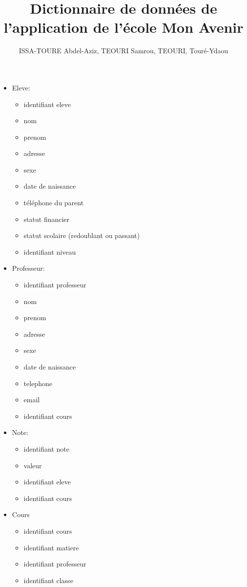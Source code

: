 \documentclass[12pt,a4paper]{article}
\author{ISSA-TOURE Abdel-Aziz, TEOURI Samrou, TEOURI, Touré-Ydaou}
\title{Dictionnaire de données de l'application de l'école Mon Avenir}
\begin{document}
\maketitle

\begin{itemize}
\item Eleve:
	\begin{itemize}
		\item identifiant eleve
		\item nom
		\item prenom
		\item adresse
		\item sexe
		\item date de naissance
		\item téléphone du parent
		\item statut financier
		\item statut scolaire (redoublant ou passant)
		\item identifiant niveau
	\end{itemize}

\item Professeur:
	\begin{itemize}
		\item identifiant professeur
		\item nom
		\item prenom
		\item adresse
		\item sexe
		\item date de naissance
		\item telephone
		\item email
		\item identifiant cours
	\end{itemize}

\item Note:
	\begin{itemize}
		\item identifiant note
		\item valeur
		\item identifiant eleve
		\item identifiant cours
	\end{itemize}

\item Cours
	\begin{itemize}
		\item identifiant cours
		\item identifiant matiere
		\item identifiant professeur
		\item identifiant classe
	\end{itemize}


\end{itemize}
\end{document}
